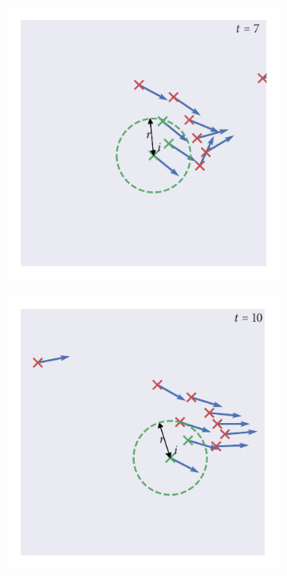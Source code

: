 \begin{figure}[tb]
\begin{subfigure}[b]{0.5\textwidth}
    \end{subfigure}
    \begin{subfigure}[b]{0.5\textwidth}
        \includegraphics{vicsek_simulation_7.pdf}
    \end{subfigure}%
    \begin{subfigure}[b]{0.5\textwidth}
        \includegraphics{vicsek_simulation_10.pdf}
    \end{subfigure}

\end{figure}
